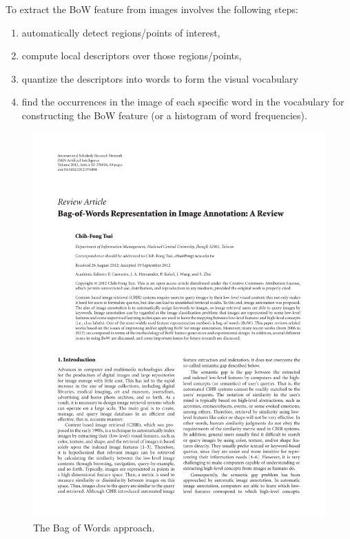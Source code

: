 To extract the BoW feature from images involves the following steps: 
\begin{enumerate}
\item automatically detect regions/points of interest,
\item compute local descriptors over those regions/points,
\item quantize the descriptors into words to form the visual vocabulary
\item find the occurrences in the image of each specific word in the vocabulary for constructing the BoW feature (or a histogram of word frequencies).
\end{enumerate}

\begin{figure}[htbp]
	\centering
		\includegraphics[page=3]{Figures/376804_cropped.pdf}
	\caption{The Bag of Words approach.}
	\label{fig:BoW}
\end{figure}


